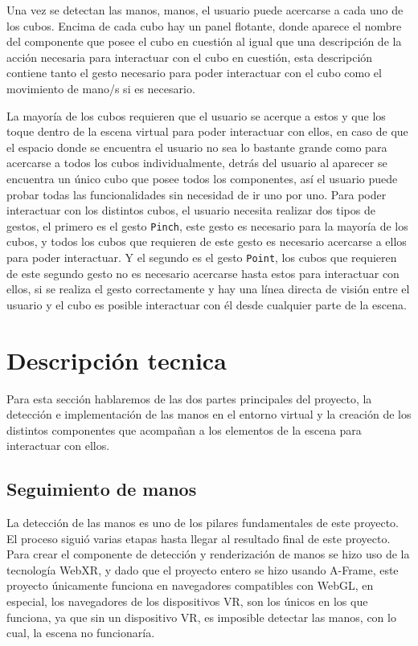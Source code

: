 \documentclass[a4paper, 12pt]{book}
\begin{document}
Una vez se detectan las manos, manos, el usuario puede acercarse a cada uno de los cubos. Encima de cada cubo hay un panel flotante, donde aparece el nombre del componente que posee el cubo en cuestión al igual que una descripción de la acción necesaria para interactuar con el cubo en cuestión, esta descripción contiene tanto el gesto necesario para poder interactuar con el cubo como el movimiento de mano/s si es necesario. 

La mayoría de los cubos requieren que el usuario se acerque a estos y que los toque dentro de la escena virtual para poder interactuar con ellos, en caso de que el espacio donde se encuentra el usuario no sea lo bastante grande como para acercarse a todos los cubos individualmente, detrás del usuario al aparecer se encuentra un único cubo que posee todos los componentes, así el usuario puede probar todas las funcionalidades sin necesidad de ir uno por uno. 
Para poder interactuar con los distintos cubos, el usuario necesita realizar dos tipos de gestos, el primero es el gesto \texttt{Pinch}, este gesto es necesario para la mayoría de los cubos, y todos los cubos que requieren de este gesto es necesario acercarse a ellos para poder interactuar. Y el segundo es el gesto \texttt{Point}, los cubos que requieren de este segundo gesto no es necesario acercarse hasta estos para interactuar con ellos, si se realiza el gesto correctamente y hay una línea directa de visión entre el usuario y el cubo es posible interactuar con él desde cualquier parte de la escena. 

\section{Descripción tecnica}
\label{sec:descripcion-tecnica}

Para esta sección hablaremos de las dos partes principales del proyecto, la detección e implementación de las manos en el entorno virtual y la creación de los distintos componentes que acompañan a los elementos de la escena para interactuar con ellos.

\subsection{Seguimiento de manos}
\label{subsec:handtracking}
La detección de las manos es uno de los pilares fundamentales de este proyecto. El proceso siguió varias etapas hasta llegar al resultado final de este proyecto. Para crear el componente de detección y renderización de manos se hizo uso de la tecnología WebXR, y dado que el proyecto entero se hizo usando A-Frame, este proyecto únicamente funciona en navegadores compatibles con WebGL, en especial, los navegadores de los dispositivos VR, son los únicos en los que funciona, ya que sin un dispositivo VR, es imposible detectar las manos, con lo cual, la escena no funcionaría.
\end{document}
